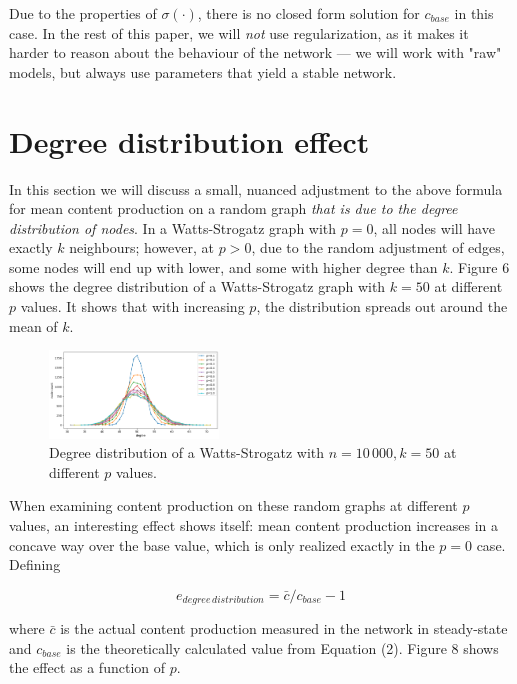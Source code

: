 \documentclass[final,5p,times,twocolumn,authoryear]{elsarticle}
\begin{document}
Due to the properties of $\sigma(\cdot)$, there is no closed form solution for $c_{base}$ in this case. In the rest of this paper, we will \textit{not} use regularization, as it makes it harder to reason about the behaviour of the network --- we will work with "raw" models, but always use parameters that yield a stable network.

\section{Degree distribution effect}

In this section we will discuss a small, nuanced adjustment to the above formula for mean content production on a random graph \textit{that is due to the degree distribution of nodes}. In a Watts-Strogatz graph with $p=0$, all nodes will have exactly $k$ neighbours; however, at $p>0$, due to the random adjustment of edges, some nodes will end up with lower, and some with higher degree than $k$. Figure 6 shows the degree distribution of a Watts-Strogatz graph with $k=50$ at different $p$ values. It shows that with increasing $p$, the distribution spreads out around the mean of $k$.

\begin{figure}[h]
	\centering 
	\includegraphics[width=0.4\textwidth]{figure-7.png}	
	\caption{Degree distribution of a Watts-Strogatz with $n=10\,000, k=50$ at different $p$ values.} 
\end{figure}

When examining content production on these random graphs at different $p$ values, an interesting effect shows itself: mean content production increases in a concave way over the base value, which is only realized exactly in the $p=0$ case. Defining

\begin{equation}
    e_{degree\,distribution} = \bar{c} / c_{base} - 1 
\end{equation}

where $\bar{c}$ is the actual content production measured in the network in steady-state and $c_{base}$ is the theoretically calculated value from Equation (2). Figure 8 shows the effect as a function of $p$.
\end{document}
